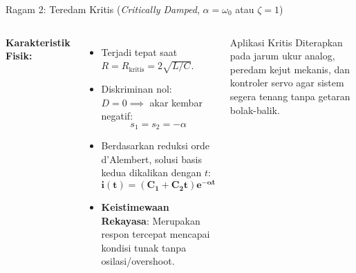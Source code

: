 \documentclass[aspectratio=169,10pt]{beamer}
\begin{document}
\begin{frame}{Ragam 2: Teredam Kritis (\textit{Critically Damped}, $\alpha = \omega_0$ atau $\zeta = 1$)}
  \begin{columns}[c]
    \textbf{Karakteristik Fisik:}
    \begin{itemize}
      \item Terjadi tepat saat $R = R_{\text{kritis}} = 2\sqrt{L/C}$.
      \item Diskriminan nol: $D = 0 \implies$ akar kembar negatif:
      \begin{equation*}
        s_1 = s_2 = -\alpha
      \end{equation*}
      \item Berdasarkan reduksi orde d'Alembert, solusi basis kedua dikalikan dengan $t$:
      \begin{equation*}
        \mathbf{i(t) = (C_1 + C_2 t) e^{-\alpha t}}
      \end{equation*}
      \item \textbf{Keistimewaan Rekayasa}: Merupakan respon tercepat mencapai kondisi tunak tanpa osilasi/overshoot.
    \end{itemize}

    \begin{alertblock}{Aplikasi Kritis}
      Diterapkan pada jarum ukur analog, peredam kejut mekanis, dan kontroler servo agar sistem segera tenang tanpa getaran bolak-balik.
    \end{alertblock}
  \end{columns}
\end{frame}
\end{document}
